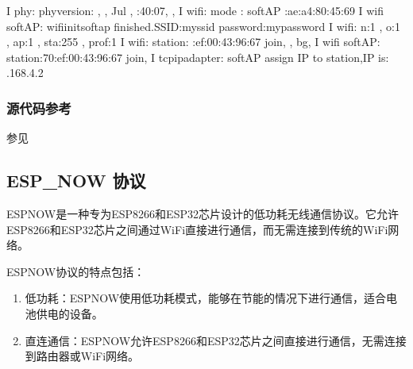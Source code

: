 \documentclass[a4paper,12pt,english]{sphinxmanual}
\begin{document}
{{\begin{sphinxVerbatim}[commandchars=\\\{\}]
I  phy: phy\PYGZus{}version: , , Jul  , :40:07, , 
I  wifi: mode : softAP :ae:a4:80:45:69
I  wifi softAP: wifi\PYGZus{}init\PYGZus{}softap finished.SSID:myssid password:mypassword
I  wifi: n:1 , o:1 , ap:1 , sta:255 , prof:1
I  wifi: station: :ef:00:43:96:67 join, , bg, 
I  wifi softAP: station:70:ef:00:43:96:67 join, 
I  tcpip\PYGZus{}adapter: softAP assign IP to station,IP is: .168.4.2
\end{sphinxVerbatim}


\subsubsection{源代码参考}
\label{\detokenize{exp-esp32/wifi/ap:id7}}
\sphinxAtStartPar
参见{\hyperref[\detokenize{reference::doc}]{}}

\sphinxstepscope


\subsection{ESP\_NOW 协议}
\label{\detokenize{exp-esp32/wifi/esp-now:esp-now}}\label{\detokenize{exp-esp32/wifi/esp-now::doc}}
\sphinxAtStartPar
ESP\sphinxhyphen{}NOW是一种专为ESP8266和ESP32芯片设计的低功耗无线通信协议。它允许ESP8266和ESP32芯片之间通过Wi\sphinxhyphen{}Fi直接进行通信，而无需连接到传统的Wi\sphinxhyphen{}Fi网络。

\sphinxAtStartPar
ESP\sphinxhyphen{}NOW协议的特点包括：
\begin{enumerate}
%
\item {} 
\sphinxAtStartPar
低功耗：ESP\sphinxhyphen{}NOW使用低功耗模式，能够在节能的情况下进行通信，适合电池供电的设备。

\item {} 
\sphinxAtStartPar
直连通信：ESP\sphinxhyphen{}NOW允许ESP8266和ESP32芯片之间直接进行通信，无需连接到路由器或Wi\sphinxhyphen{}Fi网络。


\end{enumerate}}}
\end{document}
